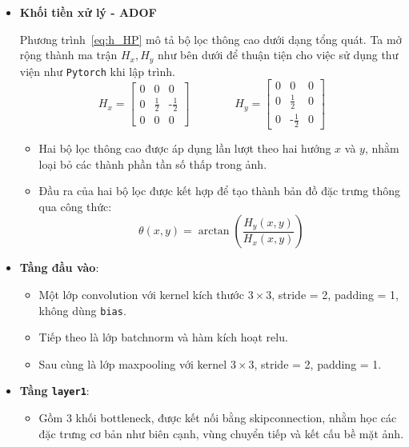 \begin{itemize}
	\item \textbf{Khối tiền xử lý - ADOF}
	
	Phương trình~\eqref{eq:h_HP} mô tả bộ lọc thông cao dưới dạng tổng quát. Ta mở rộng thành ma trận $H_x, H_y$ như bên dưới để thuận tiện cho việc sử dụng thư viện như \texttt{Pytorch} khi lập trình.
	\[
		H_x = \begin{bmatrix}
			0 & 0 & 0 \\
			0 & \tfrac{1}{2} &  \text{-}\tfrac{1}{2} \\
			0 & 0 & 0
		\end{bmatrix} \qquad \qquad
		H_y = \begin{bmatrix}
			0 & 0 & 0 \\
			0 & \tfrac{1}{2} &  0 \\
			0 & \text{-}\tfrac{1}{2} & 0
		\end{bmatrix}
	\]
	

		\begin{itemize}
			\item Hai bộ lọc thông cao được áp dụng lần lượt theo hai hướng $x$ và $y$, nhằm loại bỏ các thành phần tần số thấp trong ảnh.
			\item Đầu ra của hai bộ lọc được kết hợp để tạo thành bản đồ đặc trưng thông qua công thức:
			\[
			\theta(x, y) = \arctan\left(\frac{H_y(x, y)}{H_x(x, y)}\right)
			\]

		\end{itemize}

%
	\item \textbf{Tầng đầu vào}:
		\begin{itemize}
			\item Một lớp \gls{convolution} với \gls{kernel} kích thước \(3 \times 3\), \gls{stride} = 2, \gls{padding} = 1, không dùng \texttt{bias}.
			\item Tiếp theo là lớp \gls{batchnorm} và hàm kích hoạt \gls{relu}.
			\item Sau cùng là lớp \gls{maxpooling} với \gls{kernel} \(3 \times 3\), \gls{stride} = 2, \gls{padding} = 1.
		\end{itemize}
		\item \textbf{Tầng \texttt{layer1}}:
		\begin{itemize}
			\item Gồm 3 khối \gls{bottleneck}, được kết nối bằng \gls{skipconnection}, nhằm học các đặc trưng cơ bản như biên cạnh, vùng chuyển tiếp và kết cấu bề mặt ảnh.
		\end{itemize}
		

\end{itemize}
